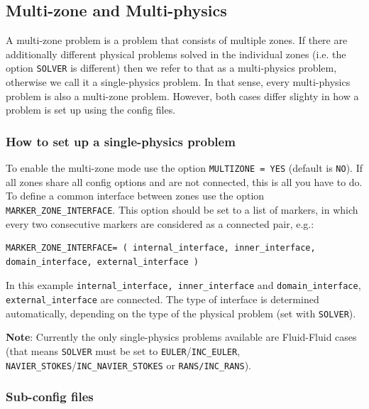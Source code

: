 \documentclass{article}
\begin{document}
\subsection{Multi-zone and Multi-physics}

A multi-zone problem is a problem that consists of multiple zones. If there are additionally different physical problems solved in the individual zones (i.e. the option \verb|SOLVER| is different) then we refer to that as a multi-physics problem, otherwise we call it a single-physics problem. In that sense, every multi-physics problem is also a multi-zone problem. However, both cases differ slighty in how a problem is set up using the config files.

\subsubsection{How to set up a single-physics problem}

To enable the multi-zone mode use the option \verb|MULTIZONE = YES| (default is \verb|NO|). If all zones share all config options and are not connected, this is all you have to do. To define a common interface between zones use the option \verb|MARKER_ZONE_INTERFACE|. This option should be set to a list of markers, in which every two consecutive markers are considered as a connected pair, e.g.:

\begin{lstlisting}
MARKER_ZONE_INTERFACE= ( internal_interface, inner_interface, domain_interface, external_interface )
\end{lstlisting}


In this example \verb|internal_interface, inner_interface| and \verb|domain_interface|,\\ \verb|external_interface| are connected. The type of interface is determined automatically, depending on the type of the physical problem (set with \verb|SOLVER|).

\textbf{Note}: Currently the only single-physics problems available are Fluid-Fluid cases (that means \verb|SOLVER| must be set to \verb|EULER|/\verb|INC_EULER|, \verb|NAVIER_STOKES|/\verb|INC_NAVIER_STOKES| or \verb|RANS/INC_RANS|).

\subsubsection{Sub-config files}
\end{document}
